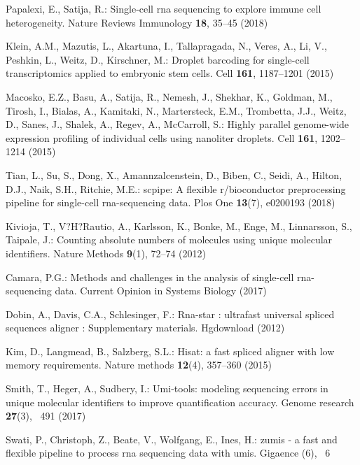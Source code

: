 \documentclass[runningheads]{llncs}
\begin{document}
\begin{thebibliography}{8} 

Papalexi, E., Satija, R.: Single-cell rna sequencing to explore immune cell
heterogeneity. Nature Reviews Immunology  \textbf{18},  35--45 (2018)

Klein, A.M., Mazutis, L., Akartuna, I., Tallapragada, N., Veres, A., Li, V.,
Peshkin, L., Weitz, D., Kirschner, M.: Droplet barcoding for single-cell
transcriptomics applied to embryonic stem cells. Cell  \textbf{161},
1187--1201 (2015)
  
Macosko, E.Z., Basu, A., Satija, R., Nemesh, J., Shekhar, K., Goldman, M.,
Tirosh, I., Bialas, A., Kamitaki, N., Martersteck, E.M., Trombetta, J.J.,
Weitz, D., Sanes, J., Shalek, A., Regev, A., McCarroll, S.: Highly parallel
genome-wide expression profiling of individual cells using nanoliter
droplets. Cell  \textbf{161},  1202--1214 (2015)

Tian, L., Su, S., Dong, X., Amannzalcenstein, D., Biben, C., Seidi, A., Hilton,
D.J., Naik, S.H., Ritchie, M.E.: scpipe: A flexible r/bioconductor
preprocessing pipeline for single-cell rna-sequencing data. Plos One
\textbf{13}(7),  e0200193 (2018)

Kivioja, T., V?H?Rautio, A., Karlsson, K., Bonke, M., Enge, M., Linnarsson, S.,
Taipale, J.: Counting absolute numbers of molecules using unique molecular
identifiers. Nature Methods  \textbf{9}(1),  72--74 (2012)

Camara, P.G.: Methods and challenges in the analysis of single-cell
rna-sequencing data. Current Opinion in Systems Biology  (2017)

Dobin, A., Davis, C.A., Schlesinger, F.: Rna-star : ultrafast universal spliced
sequences aligner : Supplementary materials. Hgdownload  (2012)

Kim, D., Langmead, B., Salzberg, S.L.: Hisat: a fast spliced aligner with low
memory requirements. Nature methods  \textbf{12}(4),  357--360 (2015)

Smith, T., Heger, A., Sudbery, I.: Umi-tools: modeling sequencing errors in
unique molecular identifiers to improve quantification accuracy. Genome
research  \textbf{27}(3), ~491 (2017)

Swati, P., Christoph, Z., Beate, V., Wolfgang, E., Ines, H.: zumis - a fast and
flexible pipeline to process rna sequencing data with umis. Gigaence (6), ~6


\end{thebibliography}
\end{document}
